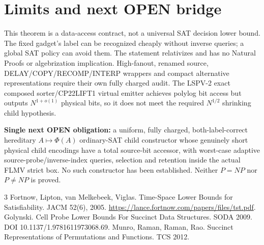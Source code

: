 \documentclass[10pt]{article}
\begin{document}
\section{Limits and next OPEN bridge}
This theorem is a data-access contract, not a universal SAT decision lower bound. The fixed gadget's label can be recognized cheaply without inverse queries; a global SAT policy can avoid them. The statement relativizes and has no Natural Proofs or algebrization implication. High-fanout, renamed source, DELAY/COPY/RECOMP/INTERP wrappers and compact alternative representations require their own fully charged audit. The LSPV-2 exact composed sorter/CP22LIFT1 virtual emitter achieves polylog bit access but outputs $N^{1+o(1)}$ physical bits, so it does not meet the required $N^{1/2}$ shrinking child hypothesis.
\par\noindent\textbf{Single next OPEN obligation:} a uniform, fully charged, both-label-correct hereditary $A\mapsto\Phi(A)$ ordinary-SAT child constructor whose genuinely short physical child encodings have a total source-bit accessor, with worst-case adaptive source-probe/inverse-index queries, selection and retention inside the actual FLMV strict box. No such constructor has been established. Neither $P=NP$ nor $P\ne NP$ is proved.
\begin{thebibliography}{3}
 Fortnow, Lipton, van Melkebeek, Viglas. Time-Space Lower Bounds for Satisfiability. JACM 52(6), 2005. \url{https://lance.fortnow.com/papers/files/tst.pdf}.
 Golynski. Cell Probe Lower Bounds For Succinct Data Structures. SODA 2009. DOI 10.1137/1.9781611973068.69.
 Munro, Raman, Raman, Rao. Succinct Representations of Permutations and Functions. TCS 2012.
\end{thebibliography}
\end{document}
